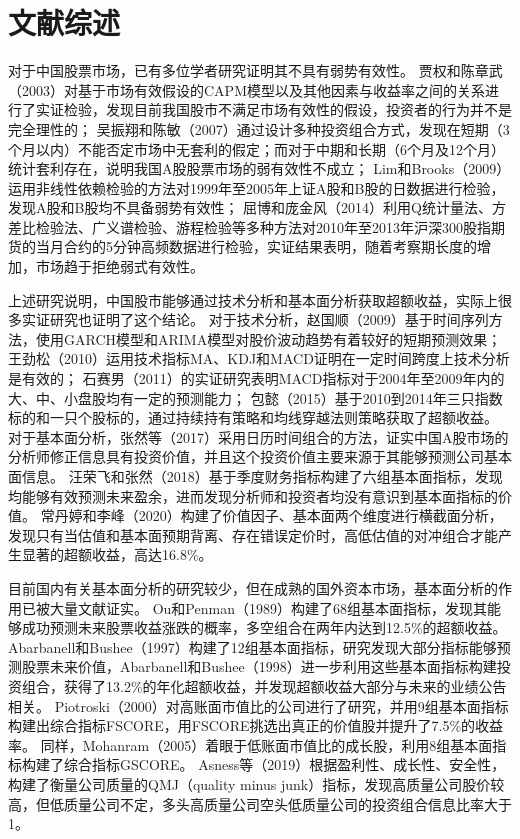 
\chapter{文献综述}
对于中国股票市场，已有多位学者研究证明其不具有弱势有效性。
贾权和陈章武（2003）对基于市场有效假设的CAPM模型以及其他因素与收益率之间的关系进行了实证检验，发现目前我国股市不满足市场有效性的假设，投资者的行为并不是完全理性的；
吴振翔和陈敏（2007）通过设计多种投资组合方式，发现在短期（3个月以内）不能否定市场中无套利的假定；而对于中期和长期（6个月及12个月） 统计套利存在，说明我国A股股票市场的弱有效性不成立；
Lim和Brooks（2009）运用非线性依赖检验的方法对1999年至2005年上证A股和B股的日数据进行检验，发现A股和B股均不具备弱势有效性；
屈博和庞金风（2014）利用Q统计量法、方差比检验法、广义谱检验、游程检验等多种方法对2010年至2013年沪深300股指期货的当月合约的5分钟高频数据进行检验，实证结果表明，随着考察期长度的增加，市场趋于拒绝弱式有效性。

上述研究说明，中国股市能够通过技术分析和基本面分析获取超额收益，实际上很
多实证研究也证明了这个结论。
对于技术分析，赵国顺（2009）基于时间序列方法，使用GARCH模型和ARIMA模型对股价波动趋势有着较好的短期预测效果；
王劲松（2010）运用技术指标MA、KDJ和MACD证明在一定时间跨度上技术分析是有效的；
石赛男（2011）的实证研究表明MACD指标对于2004年至2009年内的大、中、小盘股均有一定的预测能力；
包懿（2015）基于2010到2014年三只指数标的和一只个股标的，通过持续持有策略和均线穿越法则策略获取了超额收益。
对于基本面分析，张然等（2017）采用日历时间组合的方法，证实中国A股市场的分析师修正信息具有投资价值，并且这个投资价值主要来源于其能够预测公司基本面信息。
汪荣飞和张然（2018）基于季度财务指标构建了六组基本面指标，发现均能够有效预测未来盈余，进而发现分析师和投资者均没有意识到基本面指标的价值。
常丹婷和李峰（2020）构建了价值因子、基本面两个维度进行横截面分析，发现只有当估值和基本面预期背离、存在错误定价时，高低估值的对冲组合才能产生显著的超额收益，高达16.8\%。

目前国内有关基本面分析的研究较少，但在成熟的国外资本市场，基本面分析的作用已被大量文献证实。
Ou和Penman（1989）构建了68组基本面指标，发现其能够成功预测未来股票收益涨跌的概率，多空组合在两年内达到12.5\%的超额收益。
Abarbanell和Bushee（1997）构建了12组基本面指标，研究发现大部分指标能够预测股票未来价值，Abarbanell和Bushee（1998）进一步利用这些基本面指标构建投资组合，获得了13.2\%的年化超额收益，并发现超额收益大部分与未来的业绩公告相关。
Piotroski（2000）对高账面市值比的公司进行了研究，并用9组基本面指标构建出综合指标FSCORE，用FSCORE挑选出真正的价值股并提升了7.5\%的收益率。
同样，Mohanram（2005）着眼于低账面市值比的成长股，利用8组基本面指标构建了综合指标GSCORE。
Asness等（2019）根据盈利性、成长性、安全性，构建了衡量公司质量的QMJ（quality minus junk）指标，发现高质量公司股价较高，但低质量公司不定，多头高质量公司空头低质量公司的投资组合信息比率大于1。


